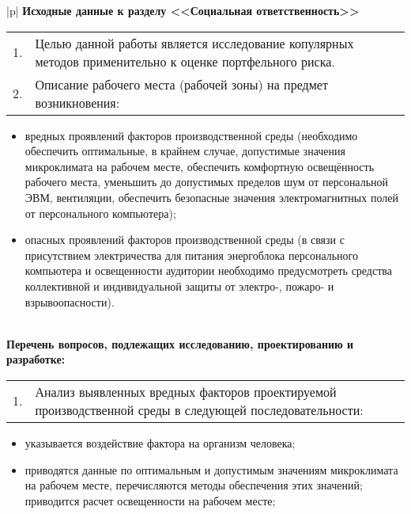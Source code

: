 \begin{longtable}
{|p{\tabcolsep}|}
\endfirsthead
\endhead
\endfoot
\endlastfoot
\hline
\textbf{Исходные данные к разделу <<Социальная ответственность>>}
\\ \hline
\begin{itshape}
\begin{tabular}{p{0.2cm}p{\hsize-0.7cm}}
1. & Целью данной работы является исследование копулярных методов применительно к оценке портфельного риска. \\
2. & Описание рабочего места (рабочей зоны) на предмет возникновения:
\end{tabular}
\begin{itemize}[leftmargin=1.2cm,topsep=-1ex,labelsep=0pt,labelwidth=0.5cm,after=\vspace{-\baselineskip}]
    \item вредных проявлений факторов производственной среды  (необходимо обеспечить оптимальные, в крайнем случае, допустимые значения микроклимата на рабочем месте, обеспечить комфортную освещённость рабочего места, уменьшить до допустимых пределов шум от персональной ЭВМ, вентиляции, обеспечить безопасные значения электромагнитных полей от персонального компьютера);
    \item опасных проявлений факторов производственной среды (в связи с присутствием электричества для питания энергоблока персонального компьютера и освещенности аудитории необходимо предусмотреть средства коллективной и индивидуальной защиты от электро-, пожаро- и взрывоопасности).
\end{itemize}
\end{itshape}
\\ \hline
\textbf{Перечень вопросов, подлежащих исследованию, проектированию и разработке:}
\\ \hline
\begin{itshape}
\begin{tabular}{p{0.2cm}p{\hsize-0.7cm}}
1. & Анализ выявленных вредных факторов проектируемой производственной среды в следующей последовательности:
\end{tabular}
\begin{itemize}[leftmargin=1.2cm,topsep=-1ex,labelsep=0pt,labelwidth=0.5cm,after=\vspace{-\baselineskip}]
    \item указывается воздействие фактора на организм человека;
    \item приводятся данные по оптимальным и допустимым значениям микроклимата на рабочем месте, перечисляются методы обеспечения этих значений; приводится расчет освещенности на рабочем месте;

\end{itemize}
\end{itshape}
\end{longtable}
